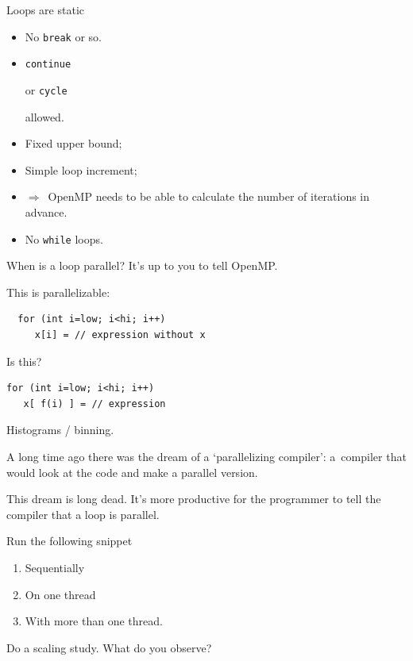 \begin{numberedframe}{Loops are static}
  \begin{itemize}
  \item No \lstinline{break} or so.
  \item \lstinline{continue}
\begin{fortran}
    or \lstinline{cycle}
\end{fortran}
    allowed.
  \item Fixed upper bound;
  \item Simple loop increment;
  \item $\Rightarrow$~OpenMP needs to be able to calculate
    the number of iterations in advance.
  \item No \lstinline{while} loops.
  \end{itemize}
\end{numberedframe}

\begin{numberedframe}{When is a loop parallel?}
  It's up to you to tell OpenMP.

  This is parallelizable:
\begin{lstlisting}
  for (int i=low; i<hi; i++)
     x[i] = // expression without x
\end{lstlisting}
Is this?
\begin{lstlisting}
for (int i=low; i<hi; i++)
   x[ f(i) ] = // expression
\end{lstlisting}
Histograms / binning.
\end{numberedframe}

\begin{instructor}
  A long time ago there was the dream of a `parallelizing compiler':
  a~compiler that would look at the code and make a parallel version.

  This dream is long dead.
  It's more productive for the programmer to tell the compiler
  that a loop is parallel.
\end{instructor}

\begin{exerciseframe}
  
\end{exerciseframe}

\begin{exerciseframe}[nestedloops]
  Run the following snippet
  \begin{enumerate}
  \item Sequentially
  \item On one thread
  \item With more than one thread.
  \end{enumerate}
  Do a scaling study.
  What do you observe?
\end{exerciseframe}

